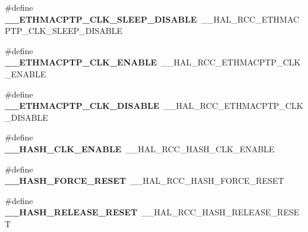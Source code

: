 \begin{DoxyCompactItemize}
\item 
\hypertarget{group___h_a_l___r_c_c___aliased_gaec8c28c7d3756083ad01edb3f5c89af1}{\#define {\bfseries \-\_\-\-\_\-\-E\-T\-H\-M\-A\-C\-P\-T\-P\-\_\-\-C\-L\-K\-\_\-\-S\-L\-E\-E\-P\-\_\-\-D\-I\-S\-A\-B\-L\-E}~\-\_\-\-\_\-\-H\-A\-L\-\_\-\-R\-C\-C\-\_\-\-E\-T\-H\-M\-A\-C\-P\-T\-P\-\_\-\-C\-L\-K\-\_\-\-S\-L\-E\-E\-P\-\_\-\-D\-I\-S\-A\-B\-L\-E}\label{group___h_a_l___r_c_c___aliased_gaec8c28c7d3756083ad01edb3f5c89af1}

\item 
\hypertarget{group___h_a_l___r_c_c___aliased_ga766456044c0297038af8f53d58575c6b}{\#define {\bfseries \-\_\-\-\_\-\-E\-T\-H\-M\-A\-C\-P\-T\-P\-\_\-\-C\-L\-K\-\_\-\-E\-N\-A\-B\-L\-E}~\-\_\-\-\_\-\-H\-A\-L\-\_\-\-R\-C\-C\-\_\-\-E\-T\-H\-M\-A\-C\-P\-T\-P\-\_\-\-C\-L\-K\-\_\-\-E\-N\-A\-B\-L\-E}\label{group___h_a_l___r_c_c___aliased_ga766456044c0297038af8f53d58575c6b}

\item 
\hypertarget{group___h_a_l___r_c_c___aliased_gaff291385ffdf68d3d1d336cd4fa0f72e}{\#define {\bfseries \-\_\-\-\_\-\-E\-T\-H\-M\-A\-C\-P\-T\-P\-\_\-\-C\-L\-K\-\_\-\-D\-I\-S\-A\-B\-L\-E}~\-\_\-\-\_\-\-H\-A\-L\-\_\-\-R\-C\-C\-\_\-\-E\-T\-H\-M\-A\-C\-P\-T\-P\-\_\-\-C\-L\-K\-\_\-\-D\-I\-S\-A\-B\-L\-E}\label{group___h_a_l___r_c_c___aliased_gaff291385ffdf68d3d1d336cd4fa0f72e}

\item 
\hypertarget{group___h_a_l___r_c_c___aliased_ga27a43502b6e59c8eb666781a340b412b}{\#define {\bfseries \-\_\-\-\_\-\-H\-A\-S\-H\-\_\-\-C\-L\-K\-\_\-\-E\-N\-A\-B\-L\-E}~\-\_\-\-\_\-\-H\-A\-L\-\_\-\-R\-C\-C\-\_\-\-H\-A\-S\-H\-\_\-\-C\-L\-K\-\_\-\-E\-N\-A\-B\-L\-E}\label{group___h_a_l___r_c_c___aliased_ga27a43502b6e59c8eb666781a340b412b}

\item 
\hypertarget{group___h_a_l___r_c_c___aliased_ga2dd43b4ddd51ec5b1242492e094d3a13}{\#define {\bfseries \-\_\-\-\_\-\-H\-A\-S\-H\-\_\-\-F\-O\-R\-C\-E\-\_\-\-R\-E\-S\-E\-T}~\-\_\-\-\_\-\-H\-A\-L\-\_\-\-R\-C\-C\-\_\-\-H\-A\-S\-H\-\_\-\-F\-O\-R\-C\-E\-\_\-\-R\-E\-S\-E\-T}\label{group___h_a_l___r_c_c___aliased_ga2dd43b4ddd51ec5b1242492e094d3a13}

\item 
\hypertarget{group___h_a_l___r_c_c___aliased_gac3ede6a3866857961ca8374a199bfa69}{\#define {\bfseries \-\_\-\-\_\-\-H\-A\-S\-H\-\_\-\-R\-E\-L\-E\-A\-S\-E\-\_\-\-R\-E\-S\-E\-T}~\-\_\-\-\_\-\-H\-A\-L\-\_\-\-R\-C\-C\-\_\-\-H\-A\-S\-H\-\_\-\-R\-E\-L\-E\-A\-S\-E\-\_\-\-R\-E\-S\-E\-T}\label{group___h_a_l___r_c_c___aliased_gac3ede6a3866857961ca8374a199bfa69}


\end{DoxyCompactItemize}
